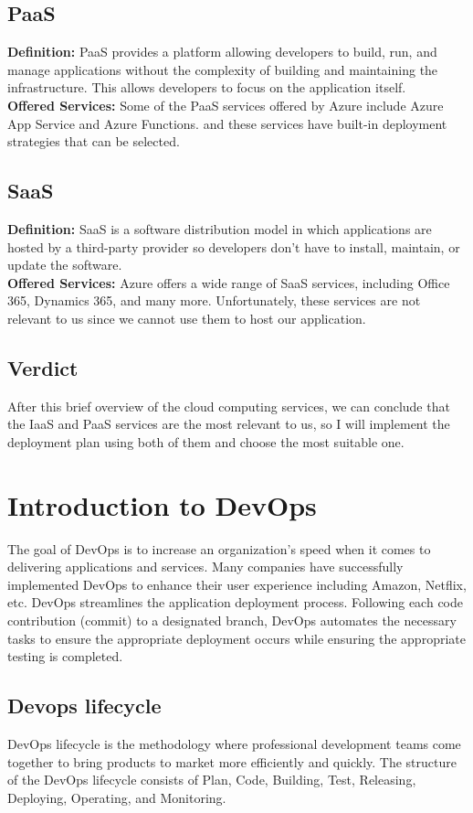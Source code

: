 \subsection*{PaaS}
\noindent
\textbf{Definition:} PaaS provides a platform allowing developers to build, run, and manage applications without the complexity of building and maintaining the infrastructure. This allows developers to focus on the application itself.
\noindent \\
\textbf{Offered Services:} Some of the PaaS services offered by Azure include Azure App Service and Azure Functions. and these services have built-in deployment strategies that can be selected.
\subsection*{SaaS}
\noindent
\textbf{Definition:} SaaS is a software distribution model in which applications are hosted by a third-party provider so developers don't have to install, maintain, or update the software.
\noindent \\
\textbf{Offered Services:} Azure offers a wide range of SaaS services, including Office 365, Dynamics 365, and many more. Unfortunately, these services are not relevant to us since we cannot use them to host our application.
\subsection*{Verdict}
After this brief overview of the cloud computing services, we can conclude that the IaaS and PaaS services are the most relevant to us, so I will implement the deployment plan using both of them and choose the most suitable one.

\section{Introduction to DevOps\cite{webArticle0}}
The goal of DevOps is to increase an organization's speed when it comes to delivering applications and services. Many companies have successfully implemented DevOps to enhance their user experience including Amazon, Netflix, etc.
DevOps streamlines the application deployment process. Following each code contribution (commit) to a designated branch, DevOps automates the necessary tasks to ensure the appropriate deployment occurs while ensuring the appropriate testing is completed.
\subsection{Devops lifecycle}
DevOps lifecycle is the methodology where professional development teams come together to bring products to market more efficiently and quickly. The structure of the DevOps lifecycle consists of Plan, Code, Building, Test, Releasing, Deploying, Operating,  and Monitoring.

